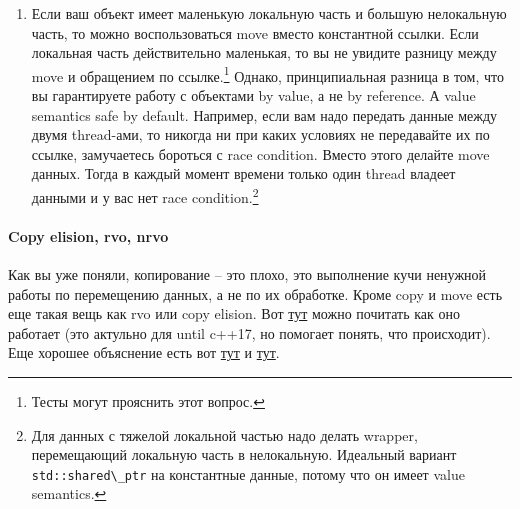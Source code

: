 \documentclass{article}
\begin{document}
\begin{enumerate}
\item Если ваш объект имеет маленькую локальную часть и большую нелокальную часть, то можно воспользоваться move вместо константной ссылки. Если локальная часть действительно маленькая, то вы не увидите разницу между move и обращением по ссылке.\footnote{Тесты могут прояснить этот вопрос.} Однако, принципиальная разница в том, что вы гарантируете работу с объектами by value, а не by reference. А value semantics safe by default. Например, если вам надо передать данные между двумя thread-ами, то никогда ни при каких условиях не передавайте их по ссылке, замучаетесь бороться с race condition. Вместо этого делайте move данных. Тогда в каждый момент времени только один thread владеет данными и у вас нет race condition.\footnote{Для данных с тяжелой локальной частью надо делать wrapper, перемещающий локальную часть в нелокальную. Идеальный вариант \verb"std::shared\_ptr" на константные данные, потому что он имеет value semantics.}
\end{enumerate}

\paragraph{Copy elision, rvo, nrvo}

Как вы уже поняли, копирование -- это плохо, это выполнение кучи ненужной работы по перемещению данных, а не по их обработке. Кроме copy и move есть еще такая вещь как rvo или copy elision. Вот \href{https://www.ibm.com/developerworks/community/blogs/5894415f-be62-4bc0-81c5-3956e82276f3/entry/RVO_V_S_std_move?lang=en}{тут} можно почитать как оно работает (это актульно для until c++17, но помогает понять, что происходит). Еще хорошее объяснение есть вот \href{https://stackoverflow.com/questions/12953127/what-are-copy-elision-and-return-value-optimization}{тут} и \href{https://stackoverflow.com/questions/38043319/how-does-guaranteed-copy-elision-work}{тут}.
\end{document}
